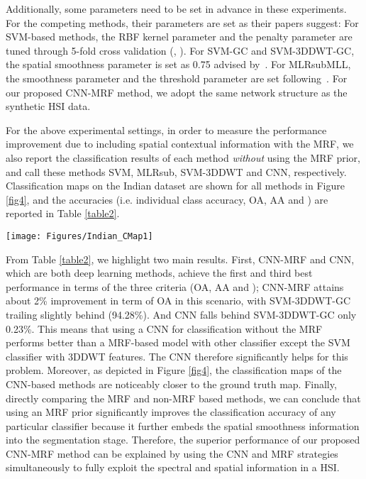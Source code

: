 \documentclass[journal]{IEEEtran}
\begin{document}
		
		Additionally, some parameters need to be set in advance in these experiments. For the competing methods, their parameters are set as their papers suggest: For SVM-based methods, the RBF kernel parameter  and the penalty parameter  are tuned through 5-fold cross validation (, ). For SVM-GC and SVM-3DDWT-GC, the spatial smoothness parameter  is set as 0.75 advised by~\cite{cao2017integration,tarabalka2014graph}. For MLRsubMLL, the smoothness parameter  and the threshold parameter  are set following~\cite{li2012spectral}. For our proposed CNN-MRF method, {{we adopt the same network structure as the synthetic HSI data.}}
		
		For the above experimental settings, in order to measure the performance improvement due to including spatial contextual information with the MRF, we also report the classification results of each method \textit{without} using the MRF prior, and call these methods SVM, MLRsub, {{SVM-3DDWT}} and CNN, respectively. Classification maps on the Indian dataset are shown for all methods in Figure \ref{fig4}, and the accuracies (i.e. individual class accuracy, OA, AA and ) are reported in Table \ref{table2}. 
		
		
		\begin{figure*}
			\centering
			\texttt{[image: Figures/Indian\_CMap1]}
			\caption{{{Classification maps obtained by all methods on the Indian Pines dataset (overall accuracies are reported in parentheses).}}}\label{fig4}
		\end{figure*}
				
		From Table \ref{table2}, we highlight two main results. First, CNN-MRF and CNN, which are both deep learning methods, achieve the first and third best performance in terms of the three criteria (OA, AA and ); CNN-MRF attains about 2\% improvement in term of OA in this scenario, with {{SVM-3DDWT-GC}} trailing slightly behind (94.28\%). {{And CNN falls behind SVM-3DDWT-GC only 0.23\%. This means that using a CNN for classification without the MRF performs better than a MRF-based model with other classifier except the SVM classifier with 3DDWT features.}} The CNN therefore significantly helps for this problem. Moreover, as depicted in Figure  \ref{fig4}, the classification maps of the CNN-based methods are noticeably closer to the ground truth map. Finally, directly comparing the MRF and non-MRF based methods, we can conclude that using an MRF prior significantly improves the classification accuracy of any particular classifier because it further embeds the spatial smoothness 
		information into the segmentation stage. Therefore, the superior performance of our proposed CNN-MRF method can be explained by using the CNN and MRF strategies simultaneously to fully exploit the spectral and spatial information in a HSI.
		
\end{document}
